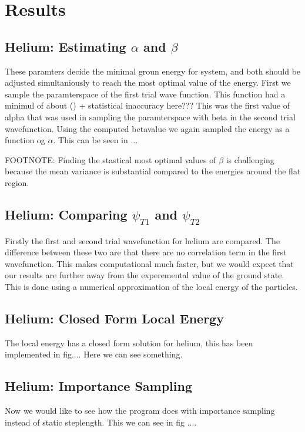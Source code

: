 \documentclass[twocolumn]{article}[12pt]
\begin{document}
\section{Results}
\subsection{Helium: Estimating $\alpha$ and $\beta$}
These paramters decide the minimal groun energy for system, and both
should be adjusted simultaniously to reach the most optimal value of the
energy. First we sample the paramterspace of the first trial wave function. 
This function had a minimul of about () + statistical inaccuracy here???
This was the first value of alpha that was used in sampling the paramterspace 
with beta in the second trial wavefunction. Using the computed betavalue we again
sampled the energy as a function og $\alpha$. This can be seen in ...

FOOTNOTE: Finding the stastical most optimal values of $\beta$ 
is challenging because the mean variance is
substantial compared to the energies around the flat region.   



\subsection{Helium: Comparing $\psi_{T1}$ and $\psi_{T2}$ }
Firstly the first and second trial wavefunction for helium are compared. 
The difference between these two are that there are no correlation term
in the first wavefunction. This makes computational much faster, but we
would expect that our results are further away from the experemental 
value of the ground state. This is done using a numerical approximation 
of the local energy of the particles. 

\subsection{Helium: Closed Form Local Energy}
The local energy has a closed form solution for helium, this has 
been implemented in fig.... Here we can see something. 

\subsection{Helium: Importance Sampling}
Now we would like to see how the program does with importance sampling instead 
of static steplength. This we can see in fig .... 
\end{document}

